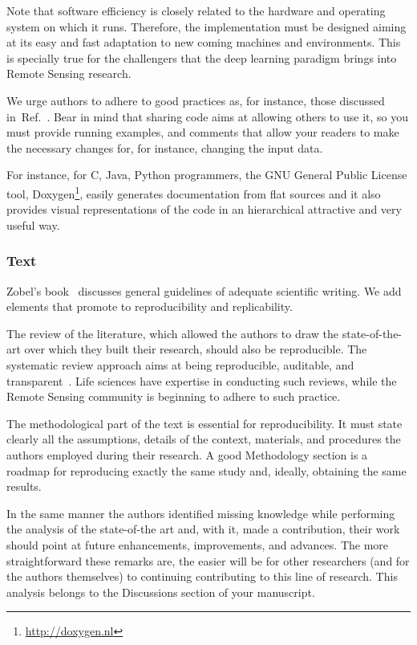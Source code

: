 \documentclass[journal,twoside]{IEEEtran}
\begin{document}
Note that software efficiency is closely related to the hardware and operating system on which it runs.
Therefore, the implementation must be designed aiming at its easy and fast adaptation to new coming machines and environments. 
This is specially true for the challengers that the deep learning paradigm brings into Remote Sensing research.

We urge authors to adhere to good practices as, for instance, those discussed in~Ref.~\cite[Chapter 7]{WritingScientificSoftware}.
Bear in mind that sharing code aims at allowing others to use it, so you must provide running examples, and comments that allow your readers to make the necessary changes for, for instance, changing the input data.

For instance, for C, Java, Python programmers, the  GNU General Public License tool, Doxygen\footnote{\url{http://doxygen.nl}}, easily generates documentation from flat sources and it also provides visual representations of the code in an hierarchical attractive and very useful way.

\subsubsection{Text}

Zobel's book~\cite{WritingforComputerScience} discusses general guidelines of adequate scientific writing.
We add elements that promote to reproducibility and replicability.

The review of the literature, which allowed the authors to draw the state-of-the-art over which they built their research, should also be reproducible.
The systematic review approach aims at being reproducible, auditable, and transparent~\cite{TowardsaMethodologyforDevelopingEvidenceInformedManagementKnowledgebyMeansofSystematicReview}.
Life sciences have expertise in conducting such reviews, while the Remote Sensing community is beginning to adhere to such practice.

The methodological part of the text is essential for reproducibility.
It must state clearly all the assumptions, details of the context, materials, and procedures the authors employed during their research.
A good Methodology section is a roadmap for reproducing exactly the same study and, ideally, obtaining the same results.

In the same manner the authors identified missing knowledge while performing the analysis of the state-of-the art and, with it, made a contribution, their work should point at future enhancements, improvements, and advances.
The more straightforward these remarks are, the easier will be for other researchers (and for the authors themselves) to continuing contributing to this line of research.
This analysis belongs to the Discussions section of your manuscript.
\end{document}
